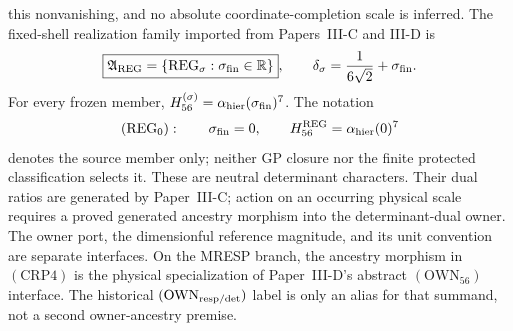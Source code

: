 \documentclass[12pt,a4paper]{article}
\begin{document}
this nonvanishing, and no absolute coordinate-completion scale is inferred.
The fixed-shell realization family imported from Papers~III-C and III-D is
\[
 \boxed{\mathfrak A_{\rm REG}
 =\{\mathrm{REG}_{\sigma}:\sigma_{\rm fin}\in\mathbb R\}},
 \qquad
 \delta_{\sigma}=\frac1{6\sqrt2}+\sigma_{\rm fin}.
\]
For every frozen member,
\(H_{56}^{(\sigma)}=\alpha_{\rm hier}(\sigma_{\rm fin})^7\).
The notation
\[
 (\mathrm{REG}_0):\qquad \sigma_{\rm fin}=0,
 \qquad
 H_{56}^{\rm REG}=\alpha_{\rm hier}(0)^7
\]
denotes the source member only; neither GP closure nor the finite protected
classification selects it.
These are neutral determinant characters.  Their dual ratios are generated by
Paper~III-C; action on an occurring physical scale requires a proved generated
ancestry morphism into the determinant-dual owner.  The owner port, the
dimensionful reference magnitude, and its unit convention are separate
interfaces.  On the MRESP branch, the ancestry morphism in
\((\mathrm{CRP4})\) is the physical specialization of Paper~III-D's abstract
\((\mathrm{OWN}_{56})\) interface.  The historical
\((\mathrm{OWN}_{\rm resp/det})\) label is only an alias for that summand,
not a second owner-ancestry premise.
\end{document}
